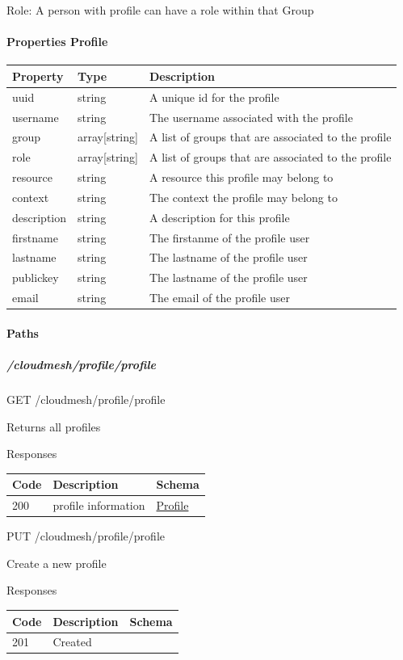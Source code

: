 \documentclass[9pt,]{article}
\let\oldparagraph\paragraph
\renewcommand{\paragraph}[1]{\oldparagraph{#1}\mbox{}}
\let\oldsubparagraph\subparagraph
\renewcommand{\subparagraph}[1]{\oldsubparagraph{#1}\mbox{}}
\begin{document}
Role: A person with profile can have a role within that Group

\hypertarget{properties-profile}{%
\paragraph{Properties Profile}\label{properties-profile}}

\begin{longtable}[]{@{}lll@{}}
\toprule
Property & Type & Description\tabularnewline
\midrule
\endhead
uuid & string & A unique id for the profile\tabularnewline
username & string & The username associated with the
profile\tabularnewline
group & array{[}string{]} & A list of groups that are associated to the
profile\tabularnewline
role & array{[}string{]} & A list of groups that are associated to the
profile\tabularnewline
resource & string & A resource this profile may belong to\tabularnewline
context & string & The context the profile may belong to\tabularnewline
description & string & A description for this profile\tabularnewline
firstname & string & The firstanme of the profile user\tabularnewline
lastname & string & The lastname of the profile user\tabularnewline
publickey & string & The lastname of the profile user\tabularnewline
email & string & The email of the profile user\tabularnewline
\bottomrule
\end{longtable}

\hypertarget{paths}{%
\paragraph{Paths}\label{paths}}

\hypertarget{cloudmeshprofileprofile}{%
\subparagraph{/cloudmesh/profile/profile}\label{cloudmeshprofileprofile}}

GET /cloudmesh/profile/profile

Returns all profiles

Responses

\begin{longtable}[]{@{}lll@{}}
\toprule
Code & Description & Schema\tabularnewline
\midrule
\endhead
200 & profile information &
\protect\hyperlink{profile}{Profile}\tabularnewline
\bottomrule
\end{longtable}

PUT /cloudmesh/profile/profile

Create a new profile

Responses

\begin{longtable}[]{@{}lll@{}}
\toprule
Code & Description & Schema\tabularnewline
\midrule
\endhead
201 & Created &\tabularnewline
\bottomrule
\end{longtable}
\end{document}
